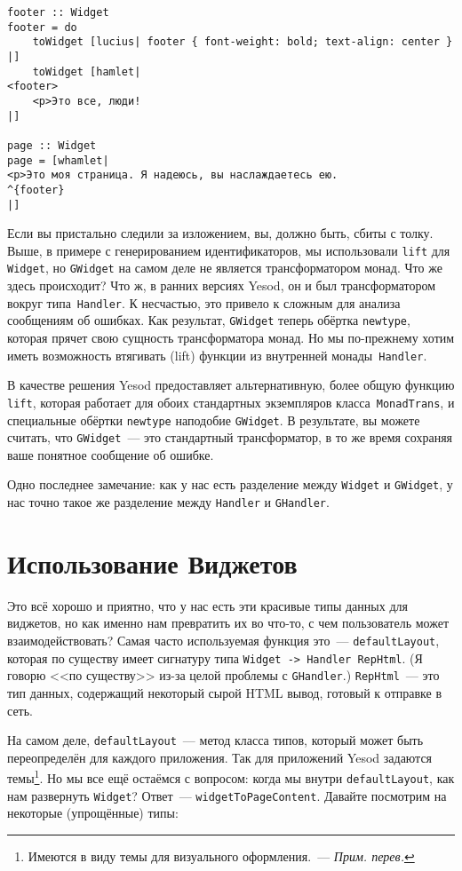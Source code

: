 \begin{lstlisting}
footer :: Widget
footer = do
    toWidget [lucius| footer { font-weight: bold; text-align: center } |]
    toWidget [hamlet|
<footer>
    <p>Это все, люди!
|]

page :: Widget
page = [whamlet|
<p>Это моя страница. Я надеюсь, вы наслаждаетесь ею.
^{footer}
|]
\end{lstlisting}

Если вы пристально следили за изложением, вы, должно быть, сбиты с толку. Выше, в примере с генерированием идентификаторов, мы использовали \lstinline'lift' для \lstinline'Widget', но \lstinline'GWidget' на самом деле не является трансформатором монад. Что же здесь происходит? Что ж, в ранних версиях Yesod, он и был трансформатором вокруг типа~\lstinline'Handler'. К несчастью, это привело к сложным для анализа сообщениям об ошибках. Как результат, \lstinline'GWidget' теперь обёртка \lstinline'newtype', которая прячет свою сущность трансформатора монад. Но мы по-прежнему хотим иметь возможность втягивать (lift) функции из внутренней монады~\lstinline'Handler'.

В качестве решения Yesod предоставляет альтернативную, более общую функцию \lstinline'lift', которая работает для обоих стандартных экземпляров класса~\lstinline'MonadTrans', и специальные обёртки \lstinline'newtype' наподобие \lstinline'GWidget'.  В результате, вы можете считать, что \lstinline'GWidget'~--- это стандартный трансформатор, в то же время сохраняя ваше понятное сообщение об ошибке.

Одно последнее замечание: как у нас есть разделение между \lstinline'Widget' и \lstinline'GWidget', у нас точно такое же разделение между \lstinline'Handler' и \lstinline'GHandler'.

\section{Использование Виджетов}

Это всё хорошо и приятно, что у нас есть эти красивые типы данных для виджетов, но как именно нам превратить их во что-то, с чем пользователь может взаимодействовать? Самая часто используемая функция это~--- \lstinline'defaultLayout', которая по существу имеет сигнатуру типа \lstinline'Widget -> Handler RepHtml'. (Я говорю <<по существу>> из-за целой проблемы с \lstinline'GHandler'.) \lstinline'RepHtml'~--- это тип данных, содержащий некоторый сырой HTML вывод, готовый к отправке в сеть.

На самом деле, \lstinline'defaultLayout'~--- метод класса типов, который может быть переопределён для каждого приложения. Так для приложений Yesod задаются темы\footnote{Имеются в виду темы для визуального оформления.~--- \emph{Прим. перев.}}. Но мы все ещё остаёмся с вопросом: когда мы внутри \lstinline'defaultLayout', как нам развернуть \lstinline'Widget'? Ответ~--- \lstinline'widgetToPageContent'. Давайте посмотрим на некоторые (упрощённые) типы:

